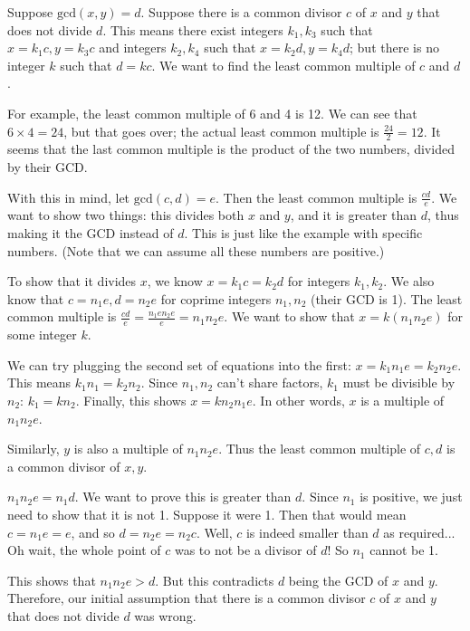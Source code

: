 \documentclass[11pt]{article}
\begin{document}
    Suppose $\mathrm{gcd}(x,y)=d$. Suppose there is a common divisor $c$ of $x$ and
    $y$ that does not divide $d$. This means there exist integers $k_1,k_3$ such that
    $x=k_1c,y=k_3c$ and integers $k_2,k_4$ such that $x=k_2d,y=k_4d$; but there is no
    integer $k$ such that $d=kc$. We want to find the least common multiple of $c$ and
    $d$.
    
    For example, the least common multiple of 6 and 4 is 12. We can see that $6\times4=24$,
    but that goes over; the actual least common multiple is $\frac{24}2=12$. It seems
    that the last common multiple is the product of the two numbers, divided by their
    GCD.
    
    With this in mind, let $\mathrm{gcd}(c,d)=e$. Then the least common multiple is
    $\frac{cd}e$. We want to show two things: this divides both $x$ and $y$, and it
    is greater than $d$, thus making it the GCD instead of $d$. This is just like the
    example with specific numbers. (Note that we can assume all these numbers are positive.)
    
    To show that it divides $x$, we know $x=k_1c=k_2d$ for integers $k_1,k_2$. 
    We also know that $c=n_1e,d=n_2e$ for coprime integers $n_1,n_2$ (their GCD is 1).
    The least common multiple is $\frac{cd}e=\frac{n_1en_2e}e=n_1n_2e$. We want to show
    that $x=k(n_1n_2e)$ for some integer $k$.
    
    We can try plugging the second set of equations into the first: $x=k_1n_1e=k_2n_2e$.
    This means $k_1n_1=k_2n_2$. Since $n_1,n_2$ can't share factors, $k_1$ must be
    divisible by $n_2$: $k_1=kn_2$. Finally, this shows $x=kn_2n_1e$. In other words,
    $x$ is a multiple of $n_1n_2e$.
    
    Similarly, $y$ is also a multiple of $n_1n_2e$. Thus the least common multiple of
    $c,d$ is a common divisor of $x,y$.
    
    $n_1n_2e=n_1d$. We want to prove this is greater than $d$. Since $n_1$ is positive,
    we just need to show that it is not 1. Suppose it were 1. Then that would mean
    $c=n_1e=e$, and so $d=n_2e=n_2c$. Well, $c$ is indeed smaller than $d$ as required...
    Oh wait, the whole point of $c$ was to not be a divisor of $d$! So $n_1$ cannot be 1.
    
    This shows that $n_1n_2e>d$. But this contradicts $d$ being the GCD of $x$
    and $y$. Therefore, our initial assumption that there is a common divisor $c$ of
    $x$ and $y$ that does not divide $d$ was wrong.
    
\end{document}
